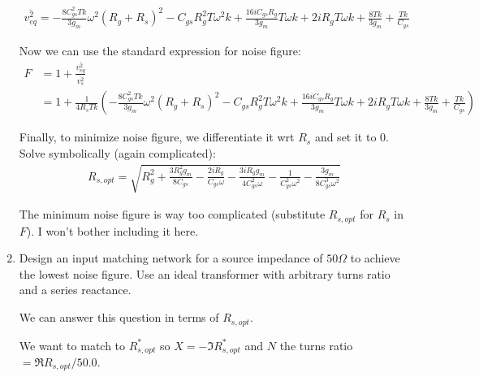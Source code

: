 \begin{enumerate}[label=(\alph*)]
    \begin{align*}
        \overline{v_{eq}^2} = - \frac{8 C_{gs}^{2} T k}{3 g_{m}} \omega^{2} \left(R_{g} + R_{s}\right)^{2} - C_{gs} R_{g}^{2} T \omega^{2} k + \frac{16 i C_{gs} R_{g}}{3 g_{m}} T \omega k + 2 i R_{g} T \omega k + \frac{8 T k}{3 g_{m}} + \frac{T k}{C_{gs}}
    \end{align*}

    Now we can use the standard expression for noise figure:
    \begin{align*}
        F &= 1 + \frac{\overline{v_{eq}^2}}{\overline{v_s^2}} \\
        &= 1 + \frac{1}{4 R_{s} T k} \left(- \frac{8 C_{gs}^{2} T k}{3 g_{m}} \omega^{2} \left(R_{g} + R_{s}\right)^{2} - C_{gs} R_{g}^{2} T \omega^{2} k + \frac{16 i C_{gs} R_{g}}{3 g_{m}} T \omega k + 2 i R_{g} T \omega k + \frac{8 T k}{3 g_{m}} + \frac{T k}{C_{gs}}\right)
    \end{align*}

    Finally, to minimize noise figure, we differentiate it wrt $R_s$ and set it to 0. Solve symbolically (again complicated):
    \begin{align*}
        R_{s,opt} = \sqrt{R_{g}^{2} + \frac{3 R_{g}^{2} g_{m}}{8 C_{gs}} - \frac{2 i R_{g}}{C_{gs} \omega} - \frac{3 i R_{g} g_{m}}{4 C_{gs}^{2} \omega} - \frac{1}{C_{gs}^{2} \omega^{2}} - \frac{3 g_{m}}{8 C_{gs}^{3} \omega^{2}}}
    \end{align*}

    The minimum noise figure is way too complicated (substitute $R_{s,opt}$ for $R_s$ in $F$). I won't bother including it here.

    \item {\color{blue} Design an input matching network for a source impedance of $50\Omega$ to achieve the lowest noise figure. Use an ideal transformer with arbitrary turns ratio and a series reactance.}

    We can answer this question in terms of $R_{s,opt}$.

    We want to match to $R_{s,opt}^*$ so $X = -\Im{R_{s,opt}^*}$ and $N$ the turns ratio $ = \Re{R_{s,opt}} / 50.0$.
\end{enumerate}

